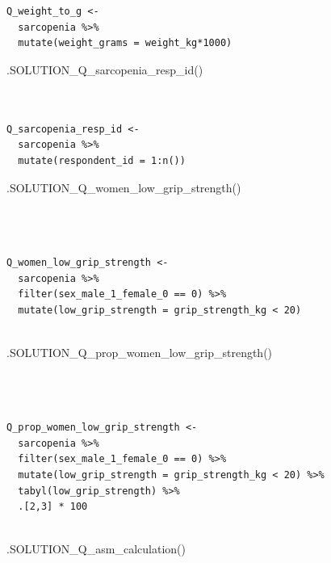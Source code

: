 \documentclass[
  letterpaper,
  DIV=11,
  numbers=noendperiod]{scrreprt}
\newenvironment{Shaded}{\begin{snugshade}}{\end{snugshade}}
\newcommand{\FunctionTok}[1]{\textcolor[rgb]{0.28,0.35,0.67}{#1}}
\newcommand{\NormalTok}[1]{\textcolor[rgb]{0.00,0.23,0.31}{#1}}
\begin{document}
\begin{verbatim}


Q_weight_to_g <- 
  sarcopenia %>% 
  mutate(weight_grams = weight_kg*1000)
\end{verbatim}

\begin{Shaded}
\begin{Highlighting}[]
\FunctionTok{.SOLUTION\_Q\_sarcopenia\_resp\_id}\NormalTok{()}
\end{Highlighting}
\end{Shaded}

\begin{verbatim}


Q_sarcopenia_resp_id <-
  sarcopenia %>%
  mutate(respondent_id = 1:n())
\end{verbatim}

\begin{Shaded}
\begin{Highlighting}[]
\FunctionTok{.SOLUTION\_Q\_women\_low\_grip\_strength}\NormalTok{()}
\end{Highlighting}
\end{Shaded}

\begin{verbatim}



Q_women_low_grip_strength <-
  sarcopenia %>%
  filter(sex_male_1_female_0 == 0) %>%
  mutate(low_grip_strength = grip_strength_kg < 20)
  
\end{verbatim}

\begin{Shaded}
\begin{Highlighting}[]
\FunctionTok{.SOLUTION\_Q\_prop\_women\_low\_grip\_strength}\NormalTok{()}
\end{Highlighting}
\end{Shaded}

\begin{verbatim}



Q_prop_women_low_grip_strength <- 
  sarcopenia %>% 
  filter(sex_male_1_female_0 == 0) %>% 
  mutate(low_grip_strength = grip_strength_kg < 20) %>% 
  tabyl(low_grip_strength) %>% 
  .[2,3] * 100
  
\end{verbatim}

\begin{Shaded}
\begin{Highlighting}[]
\FunctionTok{.SOLUTION\_Q\_asm\_calculation}\NormalTok{()}
\end{Highlighting}
\end{Shaded}
\end{document}
